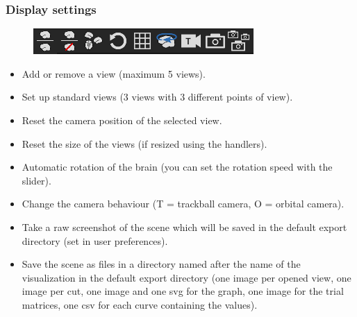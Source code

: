 \documentclass[a4paper]{article}
\begin{document}
\subsubsection{Display settings}
\begin{figure}[H]
\begin{center}
\includegraphics[scale=0.5]{DisplaySettings.png}
\end{center}
\end{figure}
\begin{itemize}
\item Add or remove a view (maximum 5 views).
\item Set up standard views (3 views with 3 different points of view).
\item Reset the camera position of the selected view.
\item Reset the size of the views (if resized using the handlers).
\item Automatic rotation of the brain (you can set the rotation speed with the slider).
\item Change the camera behaviour (T = trackball camera, O = orbital camera).
\item Take a raw screenshot of the scene which will be saved in the default export directory (set in user preferences).
\item Save the scene as files in a directory named after the name of the visualization in the default export directory (one image per opened view, one image per cut, one image and one svg for the graph, one image for the trial matrices, one csv for each curve containing the values).
\end{itemize}
\end{document}
